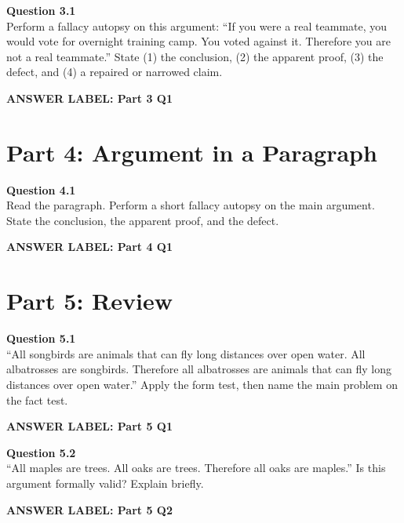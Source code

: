 \documentclass[12pt]{article}
\newcommand{\answerbox}[2]{%
\vspace{0.15em}
\noindent\textbf{#1}\par
\vspace{0.05em}
\noindent\fbox{%
\begin{minipage}[t][#2]{\dimexpr\textwidth-2\fboxsep-2\fboxrule}
\rule{\textwidth}{0pt}
\vspace{#2}
\end{minipage}
}\par
\vspace{0.25em}
}
\begin{document}
\textbf{Question 3.1}\\[-0.15em]
Perform a fallacy autopsy on this argument: ``If you were a real teammate, you would vote for overnight training camp. You voted against it. Therefore you are not a real teammate.'' State (1) the conclusion, (2) the apparent proof, (3) the defect, and (4) a repaired or narrowed claim.

\answerbox{ANSWER LABEL: Part 3 Q1}{3.15in}

\newpage

\section*{Part 4: Argument in a Paragraph}

\textbf{Question 4.1}\\[-0.15em]
Read the paragraph. Perform a short fallacy autopsy on the main argument. State the conclusion, the apparent proof, and the defect.

\vspace{0.2em}

\noindent{}

\answerbox{ANSWER LABEL: Part 4 Q1}{2.55in}

\newpage

\section*{Part 5: Review}

\textbf{Question 5.1}\\[-0.15em]
``All songbirds are animals that can fly long distances over open water. All albatrosses are songbirds. Therefore all albatrosses are animals that can fly long distances over open water.'' Apply the form test, then name the main problem on the fact test.

\answerbox{ANSWER LABEL: Part 5 Q1}{2.15in}

\textbf{Question 5.2}\\[-0.15em]
``All maples are trees. All oaks are trees. Therefore all oaks are maples.'' Is this argument formally valid? Explain briefly.

\answerbox{ANSWER LABEL: Part 5 Q2}{1.85in}
\end{document}
